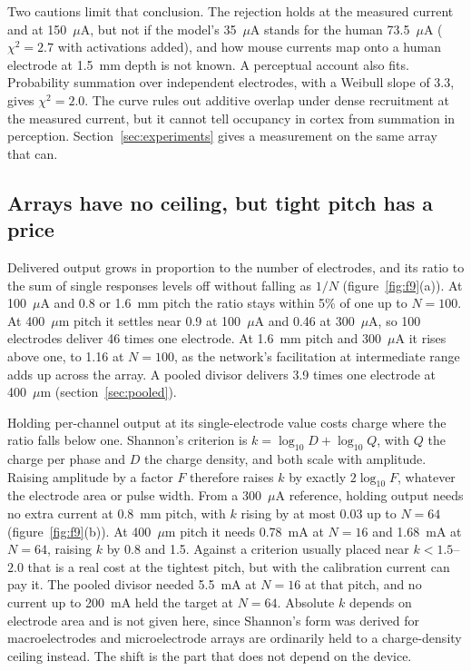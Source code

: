 \documentclass[10pt,twocolumn]{article}
\newcommand{\um}{\ensuremath{\mu\text{m}}}
\newcommand{\uA}{\ensuremath{\mu\text{A}}}
\begin{document}
Two cautions limit that conclusion. The rejection holds at the measured
current and at 150~\uA, but not if the model's 35~\uA{} stands for the
human 73.5~\uA{} ($\chi^2=2.7$ with activations added), and how mouse
currents map onto a human electrode at 1.5~mm depth is not known. A
perceptual account also fits. Probability summation over independent
electrodes, with a Weibull slope of 3.3, gives $\chi^2=2.0$. The curve
rules out additive overlap under dense recruitment at the measured current,
but it cannot tell occupancy in cortex from summation in perception.
Section~\ref{sec:experiments} gives a measurement on the same array that
can.

\subsection{Arrays have no ceiling, but tight pitch has a price}
\label{sec:arrays}

Delivered output grows in proportion to the number of electrodes, and its
ratio to the sum of single responses levels off without falling as $1/N$
(figure~\ref{fig:f9}(a)). At 100~\uA{} and 0.8 or 1.6~mm pitch the ratio
stays within 5\% of one up to $N=100$. At 400~\um{} pitch it settles near
0.9 at 100~\uA{} and 0.46 at 300~\uA, so 100 electrodes deliver 46 times
one electrode. At 1.6~mm pitch and 300~\uA{} it rises above one, to 1.16
at $N=100$, as the network's facilitation at intermediate range adds up
across the array. A pooled divisor delivers 3.9 times one electrode at
400~\um{} (section~\ref{sec:pooled}).

Holding per-channel output at its single-electrode value costs charge
where the ratio falls below one. Shannon's criterion is
$k = \log_{10} D + \log_{10} Q$, with $Q$ the charge per phase and $D$ the
charge density, and both scale with amplitude. Raising amplitude by a
factor $F$ therefore raises $k$ by exactly $2\log_{10} F$, whatever the
electrode area or pulse width. From a 300~\uA{} reference, holding output
needs no extra current at 0.8~mm pitch, with $k$ rising by at most 0.03 up
to $N=64$ (figure~\ref{fig:f9}(b)). At 400~\um{} pitch it needs 0.78~mA at
$N=16$ and 1.68~mA at $N=64$, raising $k$ by 0.8 and 1.5. Against a
criterion usually placed near $k < 1.5$--$2.0$ that is a real cost at the
tightest pitch, but with the calibration current can pay it. The pooled divisor needed 5.5~mA
at $N=16$ at that pitch, and no current up to 200~mA held the target at
$N=64$. Absolute $k$ depends on electrode area and is not given here,
since Shannon's form was derived for macroelectrodes and microelectrode
arrays are ordinarily held to a charge-density ceiling instead. The shift
is the part that does not depend on the device.
\end{document}
